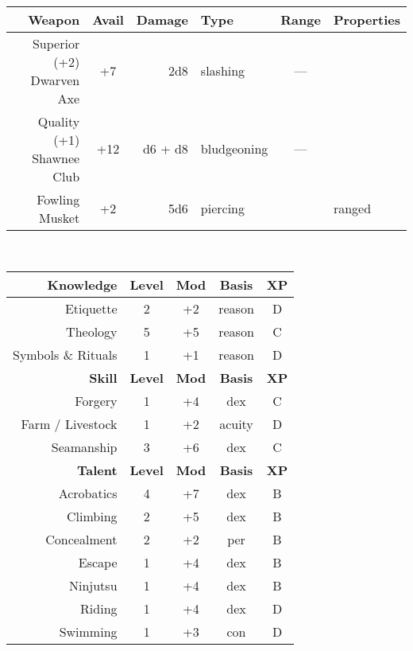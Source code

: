 \documentclass[11pt]{article}
\newcommand{\heading}[1]{{\sc\bfseries #1}}
\begin{document}
%
\\[8pt]
%
\noindent
\begin{tabular}[t]{|r|crl|c|l|}
\hline
\sc\bfseries Weapon & \sc\bfseries Avail & \sc\bfseries Damage
& \sc\bfseries Type & \sc\bfseries Range & \sc\bfseries Properties
\\ \hline\hline
Superior (+2) Dwarven Axe & +7 & 2d8 & slashing & --- &
\\
Quality (+1) Shawnee Club & +12 & d6 + d8 & bludgeoning & --- &
\\
Fowling Musket & +2 & 5d6 & piercing & & ranged
\\ \hline
\end{tabular}
%
\\[12pt]
%
\begin{tabular}[t]{|r|c|c|c|c|}
\hline
%
\heading{Knowledge} & \heading{Level} & \heading{Mod} & \heading{Basis} & \heading{XP}
\\ \hline \hline
\sc Etiquette & 2 & +2 & reason & D
\\
\sc Theology & 5 & +5 & reason & C
\\
\sc Symbols \& Rituals & 1 & +1 & reason & D
\\ \hline \hline
%
\heading{Skill} & \heading{Level} & \heading{Mod} & \heading{Basis} & \heading{XP}
\\ \hline \hline
\sc Forgery & 1 & +4 & dex & C
\\
\sc Farm / Livestock & 1 & +2 & acuity & D
\\
\sc Seamanship & 3 & +6 & dex & C
\\ \hline \hline
%
\heading{Talent} & \heading{Level} & \heading{Mod} & \heading{Basis} & \heading{XP}
\\ \hline \hline
\sc Acrobatics & 4 & +7 & dex & B
\\
\sc Climbing & 2 & +5 & dex & B
\\
\sc Concealment & 2 & +2 & per & B
\\
\sc Escape & 1 & +4 & dex & B
\\
\sc Ninjutsu & 1 & +4 & dex & B
\\
\sc Riding & 1 & +4 & dex & D
\\
\sc Swimming & 1 & +3 & con & D
\\ \hline
\end{tabular}
%
\ \ \ \ \
%
\end{document}
